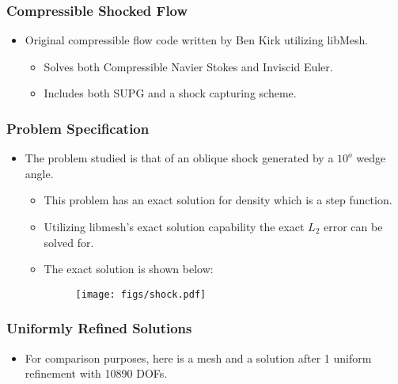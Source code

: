 \frame
{
  \frametitle{Compressible Shocked Flow}
  \begin{itemize}[<+->]
    \item Original compressible flow code written by Ben Kirk utilizing libMesh.
      \begin{itemize}[<+->]
      \item Solves both Compressible Navier Stokes and Inviscid Euler.
      \item Includes both SUPG and a shock capturing scheme.
      \end{itemize}
  \end{itemize}
}

\frame
{
  \frametitle{Problem Specification}
  \begin{itemize}[<+->]
    \item The problem studied is that of an oblique shock generated by a $10^o$ wedge angle. 
      \begin{itemize}[<+->]
      \item This problem has an exact solution for density which is a step function.
      \item Utilizing libmesh's exact solution capability the exact
$L_2$ error can be solved for.
      \item The exact solution is shown below:
        \begin{figure}
          \begin{center}
            \texttt{[image: figs/shock.pdf]}
          \end{center}
        \end{figure}
    \end{itemize}
  \end{itemize}
}

\frame
{
  \frametitle{Uniformly Refined Solutions}
  \begin{itemize}[<+->]
  \item For comparison purposes, here is a mesh and a solution after 1 uniform refinement with 10890 DOFs.
    \begin{figure}[!htb]
      \begin{center}
      \end{center}
    \end{figure}
  \end{itemize}
}

